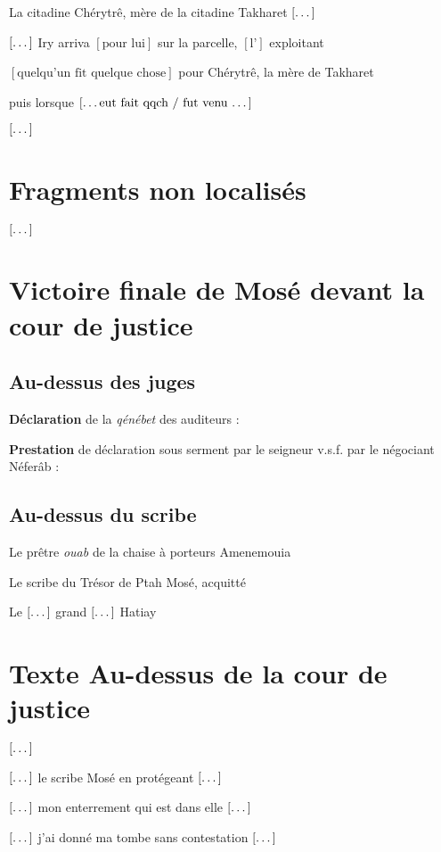\documentclass[%
  hiero, %
  background, %
  dvipsnames, %
  svgnames, %
  a4paper, %
  twoside, %
  openany, %
  10pt, %
  article, %
  oldfontcommands %
]{nefermemoir}
\newcommand{\lacune}[1][\dots]{%
  \ensuremath{%
    \left[\text{#1}\right]%
  }\xspace%
}
\begin{document}
La citadine Chérytrê, mère de la citadine Takharet \lacune

\lacune Iry arriva \lacune[pour lui] sur la parcelle, \lacune[l']exploitant

\lacune[quelqu'un fit quelque chose] pour Chérytrê, la mère de Takharet

puis lorsque \lacune[\dots eut fait qqch / fut venu \dots]

\lacune

\section{Fragments non localisés}

\lacune

\section{Victoire finale de Mosé devant la cour de justice}

\subsection{Au-dessus des juges}

\textbf{Déclaration} de la \emph{qénébet} des auditeurs : 

\textbf{Prestation} de déclaration sous serment par le seigneur v.s.f. par le négociant Néferâb : \frquote{\lacune}

\subsection{Au-dessus du scribe}

Le prêtre \emph{ouab} de la chaise à porteurs Amenemouia

Le scribe du Trésor de Ptah Mosé, acquitté

Le \lacune grand \lacune Hatiay

\section{Texte Au-dessus de la cour de justice}

\lacune

\lacune le scribe Mosé en protégeant  \lacune

\lacune mon enterrement qui est dans elle \lacune

\lacune j'ai donné ma tombe sans contestation  \lacune
\end{document}
